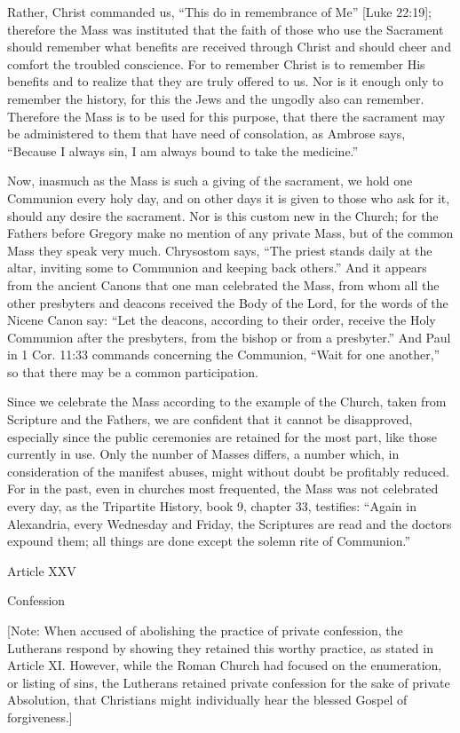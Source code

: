 Rather, Christ commanded us, “This do in remembrance of Me” [Luke 22:19]; therefore the Mass was instituted that the faith of those who use the Sacrament should remember what benefits are received through Christ and should cheer and comfort the troubled conscience. For to remember Christ is to remember His benefits and to realize that they are truly offered to us. Nor is it enough only to remember the history, for this the Jews and the ungodly also can remember. Therefore the Mass is to be used for this purpose, that there the sacrament may be administered to them that have need of consolation, as Ambrose says, “Because I always sin, I am always bound to take the medicine.”

Now, inasmuch as the Mass is such a giving of the sacrament, we hold one Communion every holy day, and on other days it is given to those who ask for it, should any desire the sacrament. Nor is this custom new in the Church; for the Fathers before Gregory make no mention of any private Mass, but of the common Mass they speak very much. Chrysostom says, “The priest stands daily at the altar, inviting some to Communion and keeping back others.” And it appears from the ancient Canons that one man celebrated the Mass, from whom all the other presbyters and deacons received the Body of the Lord, for the words of the Nicene Canon say: “Let the deacons, according to their order, receive the Holy Communion after the presbyters, from the bishop or from a presbyter.” And Paul in 1 Cor. 11:33 commands concerning the Communion, “Wait for one another,” so that there may be a common participation.

Since we celebrate the Mass according to the example of the Church, taken from Scripture and the Fathers, we are confident that it cannot be disapproved, especially since the public ceremonies are retained for the most part, like those currently in use. Only the number of Masses differs, a number which, in consideration of the manifest abuses, might without doubt be profitably reduced. For in the past, even in churches most frequented, the Mass was not celebrated every day, as the Tripartite History, book 9, chapter 33, testifies: “Again in Alexandria, every Wednesday and Friday, the Scriptures are read and the doctors expound them; all things are done except the solemn rite of Communion.”

 

Article XXV

Confession

[Note: When accused of abolishing the practice of private confession, the Lutherans respond by showing they retained this worthy practice, as stated in Article XI. However, while the Roman Church had focused on the enumeration, or listing of sins, the Lutherans retained private confession for the sake of private Absolution, that Christians might individually hear the blessed Gospel of forgiveness.]


